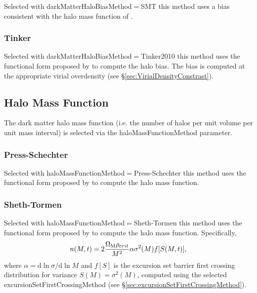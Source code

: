 Selected with {\normalfont \ttfamily darkMatterHaloBiasMethod}$=${\normalfont \ttfamily SMT} this method uses a bias consistent with the halo mass function of \cite{sheth_ellipsoidal_2001}.

\subsubsection{Tinker}

Selected with {\normalfont \ttfamily darkMatterHaloBiasMethod}$=${\normalfont \ttfamily Tinker2010} this method uses the functional form proposed by \cite{tinker_large_2010} to compute the halo bias. The bias is computed at the appropriate virial overdensity (see \S\ref{sec:VirialDensityConstrast}).

\subsection{Halo Mass Function}

The dark matter halo mass function (i.e. the number of halos per unit volume per unit mass interval) is selected via the {\normalfont \ttfamily haloMassFunctionMethod} parameter.

\subsubsection{Press-Schechter}

Selected with {\normalfont \ttfamily haloMassFunctionMethod}$=${\normalfont \ttfamily Press-Schechter} this method uses the functional form proposed by \cite{press_formation_1974} to compute the halo mass function.

\subsubsection{Sheth-Tormen}

Selected with {\normalfont \ttfamily haloMassFunctionMethod}$=${\normalfont \ttfamily Sheth-Tormen} this method uses the functional form proposed by \cite{sheth_ellipsoidal_2001} to compute the halo mass function. Specifically,
\begin{equation}
n(M,t) = 2 {\Omega_{\mathrm M} \rho_{\mathrm crit} \over M^2} \alpha \sigma^2(M) f[S(M,t)],
\end{equation}
where $\alpha = {\mathrm d}\ln\sigma/{\mathrm d}\ln M$ and $f[S]$ is the excursion set barrier first crossing distribution for variance $S(M)=\sigma^2(M)$, computed using the selected {\normalfont \ttfamily excursionSetFirstCrossingMethod} (see \S\ref{sec:excursionSetFirstCrossingMethod}).


